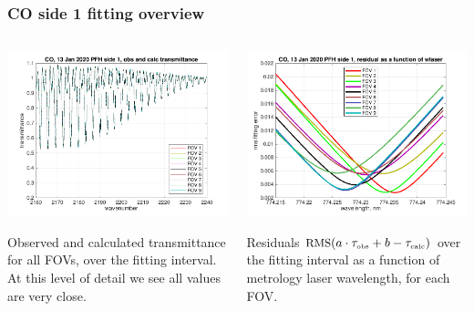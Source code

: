 \documentclass[10pt]{beamer}
\begin{document}
\begin{frame}
\frametitle{CO side 1 fitting overview}
\begin{columns}[t]
\begin{column}{0.5\textwidth}  
  \begin{centering}
  \includegraphics[width=\textwidth]{01-13_pfh_s1_CO/CO_obs_and_calc.png}
  \end{centering}\vspace{3mm}

Observed and calculated transmittance for all FOVs, over the fitting
interval.  At this level of detail we see all values are very close.

\end{column}

\begin{column}{0.5\textwidth}
  \begin{centering}
  \includegraphics[width=\textwidth]{01-13_pfh_s1_CO/CO_wlaser_fit.png}
  \end{centering}\vspace{3mm}

Residuals $\mbox{\small RMS}(a\cdot\tau_{\mbox{\tiny obs}} + b - \tau_{\mbox{\tiny calc}})$ over the fitting
interval as a function of metrology laser wavelength, for each FOV.

\end{column}
\end{columns}
\end{frame}
\end{document}
